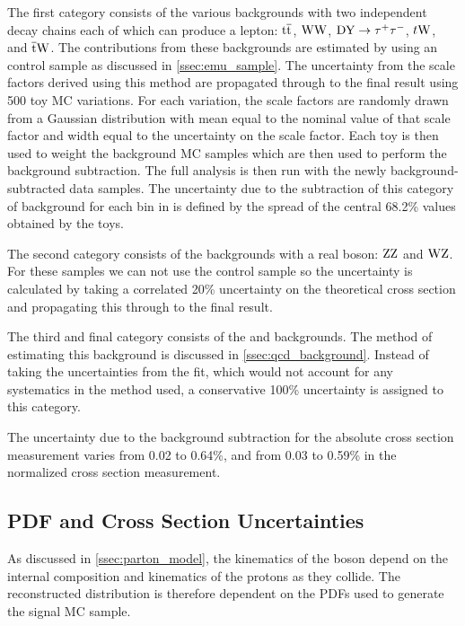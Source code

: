 The first category consists of the various backgrounds with two independent
decay chains each of which can produce a lepton: $\text{t} \overline{\text{t}}$, $\text{W}\text{W}$,
$\text{DY} \to \tau^{+} \tau^{-}$, $t\text{W}$, and $\overline{\text{t}}\text{W}$. The contributions from these backgrounds
are estimated by using an \emu control sample as discussed in
\cref{ssec:emu_sample}. The uncertainty from the scale factors derived
using this method are propagated through to the final result using 500 toy MC
variations. For each variation, the scale factors are randomly drawn from a
Gaussian distribution with mean equal to the nominal value of that scale factor
and width equal to the uncertainty on the scale factor. Each toy is then used
to weight the background MC samples  which are then used to perform the
background subtraction. The full analysis is then run with the newly
background-subtracted data samples. The uncertainty due to the subtraction of
this category of background for each bin in \phistar is defined by the spread
of the central 68.2\% values obtained by the toys.

The second category consists of the backgrounds with a real \Z boson: $\text{Z}\text{Z}$
and $\text{W}\text{Z}$. For these samples we can not use the \emu control sample so the
uncertainty is calculated by taking a correlated 20\% uncertainty on the
theoretical cross section and propagating this through to the final result.

The third and final category consists of the \QCDjets and \wjets
backgrounds. The method of estimating this background is discussed in
\cref{ssec:qcd_background}. Instead of taking the uncertainties from the
fit, which would not account for any systematics in the method used, a
conservative 100\% uncertainty is assigned to this category.

The uncertainty due to the background subtraction for the absolute cross
section measurement varies from 0.02 to 0.64\%, and from 0.03 to 0.59\% in the
normalized cross section measurement.

\subsection{PDF and Cross Section Uncertainties}
\label{ssec:pdf_uncertainties}

As discussed in \cref{ssec:parton_model}, the kinematics of the \Z boson
depend on the internal composition and kinematics of the protons as they
collide. The reconstructed \phistar distribution is therefore dependent on the
PDFs used to generate the signal MC sample.

